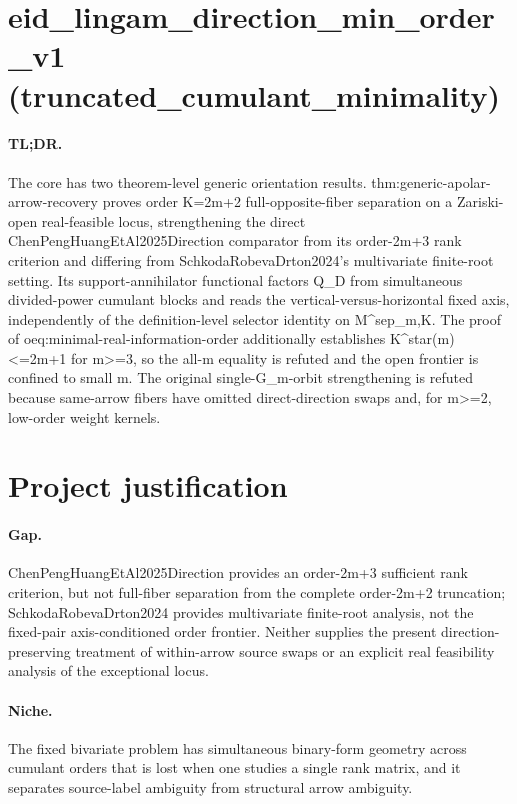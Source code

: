 \documentclass{article}
\begin{document}
\section*{eid_lingam_direction_min_order_v1 (truncated_cumulant_minimality)}

\paragraph{TL;DR.} The core has two theorem-level generic orientation results. thm:generic-apolar-arrow-recovery proves order K=2m+2 full-opposite-fiber separation on a Zariski-open real-feasible locus, strengthening the direct ChenPengHuangEtAl2025Direction comparator from its order-2m+3 rank criterion and differing from SchkodaRobevaDrton2024's multivariate finite-root setting. Its support-annihilator functional factors Q_D from simultaneous divided-power cumulant blocks and reads the vertical-versus-horizontal fixed axis, independently of the definition-level selector identity on M^{sep}_{m,K}. The proof of oeq:minimal-real-information-order additionally establishes K^star(m)<=2m+1 for m>=3, so the all-m equality is refuted and the open frontier is confined to small m. The original single-G_m-orbit strengthening is refuted because same-arrow fibers have omitted direct-direction swaps and, for m>=2, low-order weight kernels.

\section{Project justification}

\paragraph{Gap.} ChenPengHuangEtAl2025Direction provides an order-2m+3 sufficient rank criterion, but not full-fiber separation from the complete order-2m+2 truncation; SchkodaRobevaDrton2024 provides multivariate finite-root analysis, not the fixed-pair axis-conditioned order frontier. Neither supplies the present direction-preserving treatment of within-arrow source swaps or an explicit real feasibility analysis of the exceptional locus.

\paragraph{Niche.} The fixed bivariate problem has simultaneous binary-form geometry across cumulant orders that is lost when one studies a single rank matrix, and it separates source-label ambiguity from structural arrow ambiguity.
\end{document}
